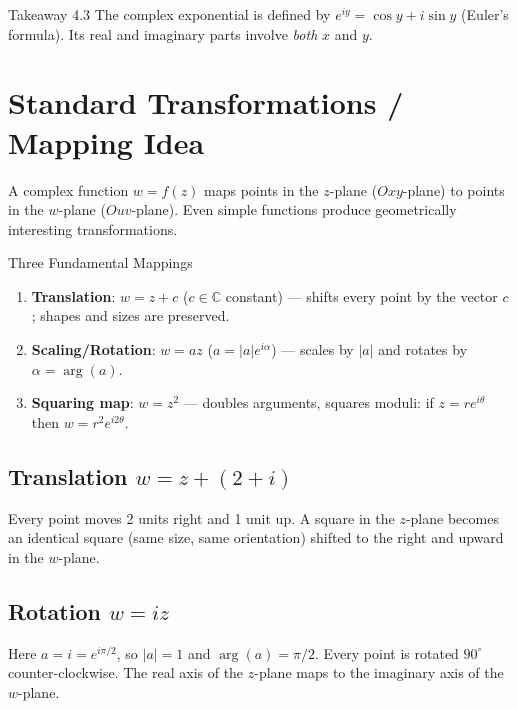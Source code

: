 \documentclass[12pt,a4paper]{article}
\begin{document}
\begin{learnbox}{Takeaway 4.3}
The complex exponential is defined by \(e^{iy}=\cos y+i\sin y\)
(Euler's formula).  Its real and imaginary parts involve \emph{both}
\(x\) and \(y\).
\end{learnbox}

\section{Standard Transformations / Mapping Idea}

A complex function \(w = f(z)\) maps points in the \(z\)-plane
(\(Oxy\)-plane) to points in the \(w\)-plane (\(Ouv\)-plane).  Even simple
functions produce geometrically interesting transformations.

\begin{infobox}{Three Fundamental Mappings}
\begin{enumerate}[noitemsep]
  \item \textbf{Translation}: \(w = z + c\) (\(c\in\mathbb{C}\) constant)
        --- shifts every point by the vector \(c\); shapes and sizes are
        preserved.
  \item \textbf{Scaling/Rotation}: \(w = az\) (\(a = |a|e^{i\alpha}\))
        --- scales by \(|a|\) and rotates by \(\alpha = \arg(a)\).
  \item \textbf{Squaring map}: \(w = z^2\)
        --- doubles arguments, squares moduli: if \(z = re^{i\theta}\)
        then \(w = r^2 e^{i2\theta}\).
\end{enumerate}
\end{infobox}

\subsection*{Translation \(w = z + (2+i)\)}

Every point moves 2 units right and 1 unit up.  A square in the \(z\)-plane
becomes an identical square (same size, same orientation) shifted to the
right and upward in the \(w\)-plane.

\subsection*{Rotation \(w = iz\)}

Here \(a = i = e^{i\pi/2}\), so \(|a|=1\) and \(\arg(a)=\pi/2\).  Every
point is rotated \(90^{\circ}\) counter-clockwise.  The real axis of the
\(z\)-plane maps to the imaginary axis of the \(w\)-plane.
\end{document}
